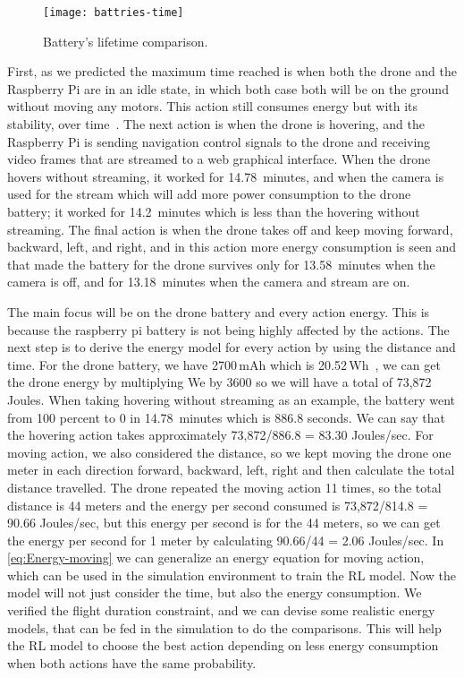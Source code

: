 \documentclass[../main.tex]{subfiles}
\begin{document}
\begin{figure}[tbp]
	\centering
	\texttt{[image: battries-time]}
	\caption{Battery's lifetime comparison.}
	\label{fig:time-comparison}
\end{figure}

First, as we predicted 
the maximum time reached is when both the drone and 
the Raspberry Pi are in an idle state, in which both case both will 
be on the ground without moving any motors.
This action still consumes energy but with 
its stability, over time~\cite{Abey18}. 
The next action is when the drone is hovering, and 
the Raspberry Pi is sending navigation control 
signals to the drone and receiving video frames 
that are streamed to a web graphical interface. 
When the drone hovers without streaming, it worked 
for \SI{14.78}{minutes}, and when the camera is used for 
the stream which will add more power consumption to 
the drone battery; it worked for \SI{14.2}{minutes} which 
is less than the hovering without streaming. The final 
action is when the drone takes off and keep moving 
forward, backward, left, and right, and in this action 
more energy consumption is seen and that made the 
battery for the drone survives only for \SI{13.58}{minutes}
when the camera is off, and for \SI{13.18}{minutes} 
when the camera and stream are on.

The main focus will be on the drone battery and every 
action energy. This is because the raspberry pi battery 
is not being highly affected by the actions. 
The next step is to derive the energy model for every 
action by using the distance and time. For the drone battery, 
we have 2700\,mAh which is 20.52\,Wh~\cite{Par19}, 
we can get the drone energy by multiplying We by 3600 
so we will have a total of 73,872 Joules. When taking
hovering without streaming as an example, the battery 
went from 100 percent to 0 in \SI{14.78}{minutes} which is 
886.8 seconds. We can say that the hovering action takes 
approximately 73,872/886.8 = 83.30 Joules/sec. 
For moving action,
we also considered the distance, so we kept 
moving the drone one meter in each direction 
{forward, backward, left, right} and then calculate 
the total distance travelled. The drone repeated 
the moving action 11 times, so the total distance 
is 44 meters and the energy per second consumed 
is 73,872/814.8 = 90.66 Joules/sec, but this energy 
per second is for the 44 meters, so we can get the 
energy per second for 1 meter by calculating 
90.66/44 = 2.06 Joules/sec. 
In \cref{eq:Energy-moving} we can generalize an energy 
equation for moving action, which can be used in the simulation 
environment to train the RL model. Now the model will not 
just consider the time, but also the energy consumption.
We verified the flight duration constraint, and we can devise some 
realistic energy models, that can be fed in the simulation 
to do the comparisons. This will help the RL model to choose 
the best action depending on less energy consumption 
when both actions have the same probability. 
\end{document}
